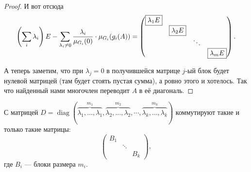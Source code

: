 \begin{proof}
    И вот отсюда
    \[
        \left(\sum_i\lambda_i\right)E - \sum_{\lambda_i \ne 0}\frac{\lambda_i}{\mu_{G_i}(0)} \cdot \mu_{G_i}(g_i(A)) =
        \begin{pmatrix}
            \fbox{$\lambda_1E$} & & & \\
             & \fbox{$\lambda_2E$} & &\\
             & & \ddots &\\
             & & & \fbox{$\lambda_mE$}
        \end{pmatrix}.
    \]

    А теперь заметим, что при $\lambda_j = 0$ в получившейся матрице $j$-ый блок будет нулевой матрицей (там будет стоять пустая сумма), а ровно этого и хотелось. Так что найденный нами многочлен переводит $A$ в её диагональ.
\end{proof}

\begin{lemma}
    С матрицей $D = \operatorname{diag}(\overbrace{\lambda_1, \ldots, \lambda_1}^{m_1}, \overbrace{\lambda_2, \ldots, \lambda_2}^{m_2}, \cdots, \overbrace{\lambda_k, \ldots, \lambda_k}^{m_k})$ коммутируют такие и только такие матрицы:
    \[
        \begin{pmatrix}
            B_1 & & \\
             & \ddots & \\
             & & B_k
        \end{pmatrix},
    \]
    где $B_i$ --- блоки размера $m_i$.
\end{lemma}

